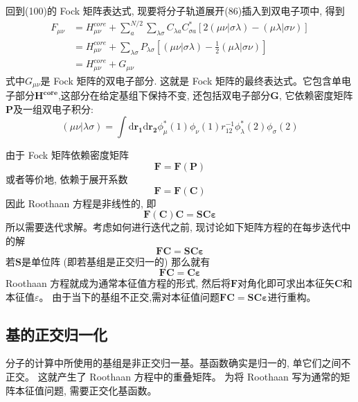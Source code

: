 \documentclass[]{article}
\begin{document}
回到(100)的 Fock 矩阵表达式, 现要将分子轨道展开(86)插入到双电子项中, 得到
\begin{align}
	F_{\mu\nu}
	&=H^{core}_{\mu\nu}+\sum\limits_a^{N/2}\sum\limits_{\lambda\sigma}C_{\lambda a}C^*_{\sigma a}\left[ 2(\mu\nu|\sigma\lambda)-(\mu\lambda|\sigma\nu)\right] \nonumber\\
	&=H^{core}_{\mu\nu}+\sum\limits_{\lambda\sigma}P_{\lambda\sigma}\left[ (\mu\nu|\sigma\lambda)-\frac{1}{2}(\mu\lambda|\sigma\nu)\right] \nonumber\\
	&=H^{core}_{\mu\nu}+G_{\mu\nu}
\end{align}
式中$G_{\mu\nu}$是 Fock 矩阵的双电子部分. 这就是 Fock 矩阵的最终表达式。它包含单电子部分$\mathbf{H^{core}}$,这部分在给定基组下保持不变, 还包括双电子部分$\mathbf{G}$, 它依赖密度矩阵$\mathbf{P}$及一组双电子积分:
\begin{equation}
	(\mu\nu|\lambda\sigma)=\int \mathrm{d}\mathbf{r_1}\mathrm{d}\mathbf{r_2}\phi^*_{\mu}(1)\phi_{\nu}(1)r^{-1}_{12}\phi^*_{\lambda}(2)\phi_{\sigma}(2)
\end{equation}

由于 Fock 矩阵依赖密度矩阵
\begin{equation}
	\mathbf{F}=\mathbf{F(P)}
\end{equation}
或者等价地, 依赖于展开系数
\begin{equation}
	\mathbf{F}=\mathbf{F(C)}
\end{equation}
因此 Roothaan 方程是非线性的, 即
\begin{equation}
	\mathbf{F(C)C}=\mathbf{SC\varepsilon}
\end{equation}
所以需要迭代求解。考虑如何进行迭代之前, 现讨论如下矩阵方程的在每步迭代中的解
\begin{equation}
	\mathbf{FC}=\mathbf{SC\varepsilon}
\end{equation}
若$\mathbf{S}$是单位阵 (即若基组是正交归一的) 那么就有
\begin{equation}
	\mathbf{FC}=\mathbf{C\varepsilon}
\end{equation}
Roothaan 方程就成为通常本征值方程的形式, 然后将$\mathbf{F}$对角化即可求出本征矢$\mathbf{C}$和本征值$\varepsilon$。 由于当下的基组不正交,需对本征值问题$\mathbf{FC}=\mathbf{SC\varepsilon}$进行重构。
\subsection{基的正交归一化}
分子的计算中所使用的基组是非正交归一基。基函数确实是归一的, 单它们之间不正交。 这就产生了 Roothaan 方程中的重叠矩阵。 为将 Roothaan 写为通常的矩阵本征值问题, 需要正交化基函数。
\end{document}
